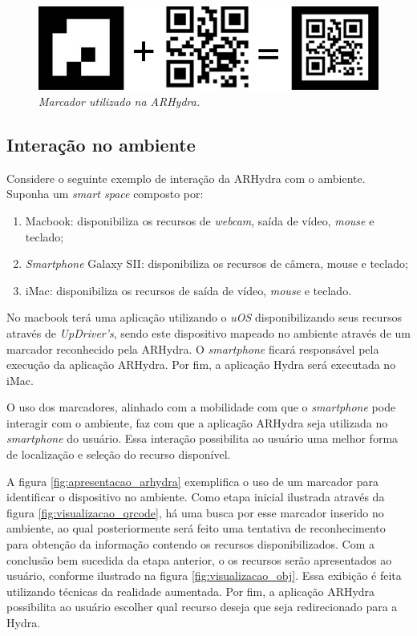 	\begin{figure}[h]
		\centering \includegraphics[scale=0.5]{figuras/cap3/marcador_arHydra.png}
		\caption{\textit{Marcador utilizado na ARHydra.}}
		\label{fig:arhydra_marcador} 
	\end{figure}
	
\subsection{Interação no ambiente}

	Considere o seguinte exemplo de interação da ARHydra com o ambiente. Suponha um 
	\textit{smart space} composto por:
	
	\begin{enumerate}
	  \item Macbook: disponibiliza os recursos de \textit{webcam}, saída de vídeo, \textit{mouse} e
	  teclado;
	  \item \textit{Smartphone} Galaxy SII: disponibiliza os recursos de câmera, mouse e teclado;
	  \item iMac: disponibiliza os recursos de saída de vídeo, \textit{mouse} e teclado.
	\end{enumerate}
	
	No macbook terá uma aplicação utilizando o \textit{uOS} disponibilizando seus recursos através de
	\textit{UpDriver's}, sendo este dispositivo mapeado no ambiente através de um marcador reconhecido
	pela ARHydra. O \textit{smartphone} ficará responsável pela execução da aplicação ARHydra. Por
	fim, a aplicação Hydra será executada no iMac. 
	
	O uso dos marcadores, alinhado com a mobilidade com que o \textit{smartphone} pode interagir com o
	ambiente, faz com que a aplicação ARHydra seja utilizada no \textit{smartphone} do usuário. Essa
	interação possibilita ao usuário uma melhor forma de localização e seleção do recurso disponível.
	
	A figura \ref{fig:apresentacao_arhydra} exemplifica o uso de um marcador para identificar o dispositivo no
	ambiente. Como etapa inicial ilustrada através da figura \ref{fig:visualizacao_qrcode}, há uma
	busca por esse marcador inserido no ambiente, ao qual posteriormente será feito uma tentativa de
	reconhecimento para obtenção da informação contendo os recursos disponibilizados. Com a conclusão
	bem sucedida da etapa anterior, o os recursos serão apresentados ao usuário, conforme ilustrado na
	figura \ref{fig:visualizacao_obj}. Essa exibição é feita utilizando técnicas da realidade
	aumentada. Por fim, a aplicação ARHydra possibilita ao usuário escolher qual recurso deseja que
	seja redirecionado para a Hydra.
	

